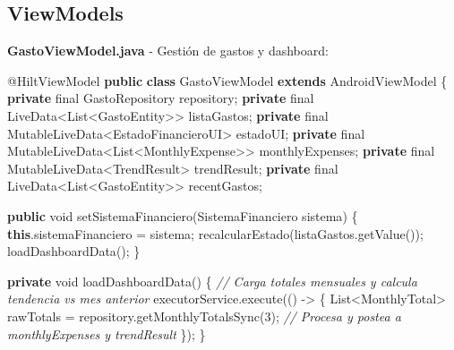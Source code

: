 \documentclass[
  spanish,
  11pt,
  paper=a4,
  ,captions=tableheading
]{scrartcl}
\newenvironment{Shaded}{}{}
\newcommand{\AttributeTok}[1]{\textcolor[rgb]{0.49,0.56,0.16}{#1}}
\newcommand{\BuiltInTok}[1]{\textcolor[rgb]{0.00,0.50,0.00}{#1}}
\newcommand{\CommentTok}[1]{\textcolor[rgb]{0.38,0.63,0.69}{\textit{#1}}}
\newcommand{\DataTypeTok}[1]{\textcolor[rgb]{0.56,0.13,0.00}{#1}}
\newcommand{\DecValTok}[1]{\textcolor[rgb]{0.25,0.63,0.44}{#1}}
\newcommand{\FunctionTok}[1]{\textcolor[rgb]{0.02,0.16,0.49}{#1}}
\newcommand{\KeywordTok}[1]{\textcolor[rgb]{0.00,0.44,0.13}{\textbf{#1}}}
\newcommand{\NormalTok}[1]{#1}
\newcommand{\OperatorTok}[1]{\textcolor[rgb]{0.40,0.40,0.40}{#1}}
\begin{document}
\hypertarget{viewmodels}{%
\subsection{ViewModels}\label{viewmodels}}

\textbf{GastoViewModel.java} - Gestión de gastos y dashboard:

\begin{Shaded}
\begin{Highlighting}[]
\AttributeTok{@HiltViewModel}
\KeywordTok{public} \KeywordTok{class}\NormalTok{ GastoViewModel }\KeywordTok{extends}\NormalTok{ AndroidViewModel }\OperatorTok{\{}
    \KeywordTok{private} \DataTypeTok{final}\NormalTok{ GastoRepository repository}\OperatorTok{;}
    \KeywordTok{private} \DataTypeTok{final}\NormalTok{ LiveData}\OperatorTok{\textless{}}\BuiltInTok{List}\OperatorTok{\textless{}}\NormalTok{GastoEntity}\OperatorTok{\textgreater{}\textgreater{}}\NormalTok{ listaGastos}\OperatorTok{;}
    \KeywordTok{private} \DataTypeTok{final}\NormalTok{ MutableLiveData}\OperatorTok{\textless{}}\NormalTok{EstadoFinancieroUI}\OperatorTok{\textgreater{}}\NormalTok{ estadoUI}\OperatorTok{;}
    \KeywordTok{private} \DataTypeTok{final}\NormalTok{ MutableLiveData}\OperatorTok{\textless{}}\BuiltInTok{List}\OperatorTok{\textless{}}\NormalTok{MonthlyExpense}\OperatorTok{\textgreater{}\textgreater{}}\NormalTok{ monthlyExpenses}\OperatorTok{;}
    \KeywordTok{private} \DataTypeTok{final}\NormalTok{ MutableLiveData}\OperatorTok{\textless{}}\NormalTok{TrendResult}\OperatorTok{\textgreater{}}\NormalTok{ trendResult}\OperatorTok{;}
    \KeywordTok{private} \DataTypeTok{final}\NormalTok{ LiveData}\OperatorTok{\textless{}}\BuiltInTok{List}\OperatorTok{\textless{}}\NormalTok{GastoEntity}\OperatorTok{\textgreater{}\textgreater{}}\NormalTok{ recentGastos}\OperatorTok{;}

    \KeywordTok{public} \DataTypeTok{void} \FunctionTok{setSistemaFinanciero}\OperatorTok{(}\NormalTok{SistemaFinanciero sistema}\OperatorTok{)} \OperatorTok{\{}
        \KeywordTok{this}\OperatorTok{.}\FunctionTok{sistemaFinanciero} \OperatorTok{=}\NormalTok{ sistema}\OperatorTok{;}
        \FunctionTok{recalcularEstado}\OperatorTok{(}\NormalTok{listaGastos}\OperatorTok{.}\FunctionTok{getValue}\OperatorTok{());}
        \FunctionTok{loadDashboardData}\OperatorTok{();}
    \OperatorTok{\}}

    \KeywordTok{private} \DataTypeTok{void} \FunctionTok{loadDashboardData}\OperatorTok{()} \OperatorTok{\{}
        \CommentTok{// Carga totales mensuales y calcula tendencia vs mes anterior}
\NormalTok{        executorService}\OperatorTok{.}\FunctionTok{execute}\OperatorTok{(()} \OperatorTok{{-}\textgreater{}} \OperatorTok{\{}
            \BuiltInTok{List}\OperatorTok{\textless{}}\NormalTok{MonthlyTotal}\OperatorTok{\textgreater{}}\NormalTok{ rawTotals }\OperatorTok{=}\NormalTok{ repository}\OperatorTok{.}\FunctionTok{getMonthlyTotalsSync}\OperatorTok{(}\DecValTok{3}\OperatorTok{);}
            \CommentTok{// Procesa y postea a monthlyExpenses y trendResult}
        \OperatorTok{\});}
    \OperatorTok{\}}


\end{Highlighting}
\end{Shaded}
\end{document}
